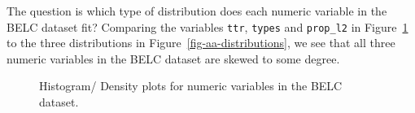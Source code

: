 \documentclass[
  letterpaper,
  DIV=11,
  numbers=noendperiod]{scrreport}
\theoremstyle{definition}
\theoremstyle{remark}
\begin{document}
The question is which type of distribution does each numeric variable in
the BELC dataset fit? Comparing the variables \texttt{ttr},
\texttt{types} and \texttt{prop\_l2} in
Figure~\ref{fig-aa-belc-histogram-density-trimmed} to the three
distributions in Figure~\ref{fig-aa-distributions}, we see that all
three numeric variables in the BELC dataset are skewed to some degree.

\begin{figure}

\begin{minipage}[t]{0.33\linewidth}

{\centering 


}

\end{minipage}%
%
\begin{minipage}[t]{0.33\linewidth}

{\centering 


}

\end{minipage}%
%
\begin{minipage}[t]{0.33\linewidth}

{\centering 


}

\end{minipage}%

\caption{\label{fig-aa-belc-histogram-density-trimmed}Histogram/ Density
plots for numeric variables in the BELC dataset.}

\end{figure}
\end{document}
